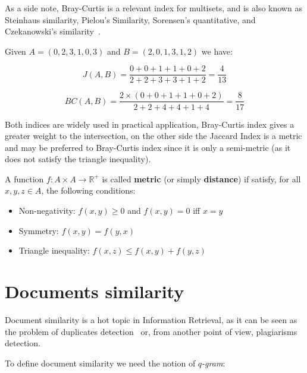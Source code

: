 As a side note, Bray-Curtis is a relevant index for multisets, and is also known as Steinhaus similarity, Pielou's Similarity, Sorensen's quantitative, and Czekanowski's similarity~\cite{legendre1998numerical}.

\begin{esempio}
	Given $A = (0, 2, 3, 1, 0, 3) $ and $B = (2, 0, 1, 3, 1, 2)$ we have:
	
	\begin{equation}
	J(A,B) = \frac{0 + 0 + 1 + 1 + 0 + 2}{2 + 2 + 3 + 3 + 1 + 2} = \frac{4}{13} 
	\end{equation}
	
	\begin{equation}
	BC(A,B) = \frac{2 \times (0 + 0 + 1 + 1 + 0 + 2) }{2 + 2 + 4 + 4 + 1 + 4} = \frac{8}{17}
	\end{equation}
\end{esempio}

Both indices are widely used in practical application, Bray-Curtis index gives a greater weight to the intersection, on the other side the Jaccard Index is a metric and may be preferred to Bray-Curtis index since it is only a semi-metric (as it does not satisfy the triangle inequality). 

\begin{definizione}
	A function $f : A \times A \rightarrow \mathbb{R}^{+} $ is called \textbf{metric} (or simply \textbf{distance}) if satisfy, for all $x, y, z \in A$, the following conditions:
	\begin{itemize}
		\item Non-negativity: $f(x,y) \geq 0$ and $f(x,y) = 0$ iff $x = y$
		\item Symmetry: $f(x, y) = f(y, x)$
		\item Triangle inequality: $f(x, z) \leq f(x, y) + f(y, z)$
	\end{itemize}
\end{definizione}

\section{Documents similarity}

Document similarity is a hot topic in Information Retrieval, as it can be seen as the problem of duplicates detection~\cite{Broder2000} or, from another point of view, plagiarisms detection.\bigskip

To define document similarity we need the notion of \textit{$q$-gram}:

